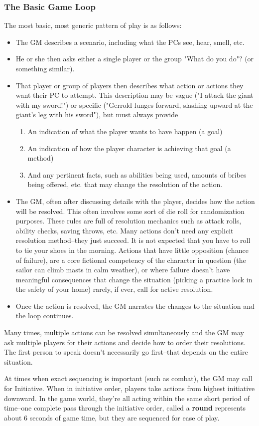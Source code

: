 \subsubsection{The Basic Game Loop}
The most basic, most generic pattern of play is as follows:
\begin{itemize}
    \item The GM describes a scenario, including what the PCs see, hear, smell, etc.
    \item He or she then asks either a single player or the group "What do you do"? (or something similar).
    \item That player or group of players then describes what action or actions they want their PC to attempt. This description may be vague ("I attack the giant with my sword!") or specific ("Gerrold lunges forward, slashing upward at the giant's leg with his sword"), but must always provide
    \begin{enumerate}
        \item An indication of what the player wants to have happen (a goal)
        \item An indication of how the player character is achieving that goal (a method)
        \item And any pertinent facts, such as abilities being used, amounts of bribes being offered, etc. that may change the resolution of the action.
    \end{enumerate}
    \item The GM, often after discussing details with the player, decides how the action will be resolved. This often involves some sort of die roll for randomization purposes. These rules are full of resolution mechanics such as attack rolls, ability checks, saving throws, etc. Many actions don't need any explicit resolution method--they just succeed. It is not expected that you have to roll to tie your shoes in the morning. Actions that have little opposition (chance of failure), are a core fictional competency of the character in question (the sailor can climb masts in calm weather), or where failure doesn't have meaningful consequences that change the situation (picking a practice lock in the safety of your home) rarely, if ever, call for active resolution.
    \item Once the action is resolved, the GM narrates the changes to the situation and the loop continues.
\end{itemize}

Many times, multiple actions can be resolved simultaneously and the GM may ask multiple players for their actions and decide how to order their resolutions. The first person to speak doesn't necessarily go first--that depends on the entire situation.

At times when exact sequencing is important (such as combat), the GM may call for Initiative. When in initiative order, players take actions from highest initiative downward. In the game world, they're all acting within the same short period of time--one complete pass through the initiative order, called a \textbf{round} represents about 6 seconds of game time, but they are sequenced for ease of play.


